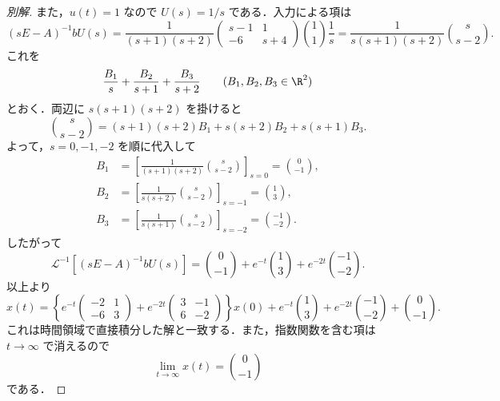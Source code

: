 \documentclass[article,paper=a4paper]{jlreq}
\begin{document}
\begin{proof}[別解]
また，$u(t)=1$ なので $U(s)=1/s$ である．入力による項は
\[
  (sE-A)^{-1}bU(s)
    =
    \frac{1}{(s+1)(s+2)}
    \begin{pmatrix}
      s-1 & 1\\
      -6 & s+4
    \end{pmatrix}
    \binom{1}{1}\frac{1}{s}
    =
    \frac{1}{s(s+1)(s+2)}
    \binom{s}{s-2}.
\]
これを
\[
  \frac{B_1}{s}+\frac{B_2}{s+1}+\frac{B_3}{s+2}
  \qquad (B_1,B_2,B_3\in\R^2)
\]
とおく．両辺に $s(s+1)(s+2)$ を掛けると
\[
  \binom{s}{s-2}
    =
    (s+1)(s+2)B_1
    +s(s+2)B_2
    +s(s+1)B_3.
\]
よって，$s=0,-1,-2$ を順に代入して
\begin{align*}
  B_1
    &=
    \left[
      \frac{1}{(s+1)(s+2)}
      \binom{s}{s-2}
    \right]_{s=0}
     =
    \binom{0}{-1},\\
  B_2
    &=
    \left[
      \frac{1}{s(s+2)}
      \binom{s}{s-2}
    \right]_{s=-1}
     =
    \binom{1}{3},\\
  B_3
    &=
    \left[
      \frac{1}{s(s+1)}
      \binom{s}{s-2}
    \right]_{s=-2}
     =
    \binom{-1}{-2}.
\end{align*}
したがって
\[
  \mathcal{L}^{-1}\!\left[(sE-A)^{-1}bU(s)\right]
    =
    \binom{0}{-1}
    +
    e^{-t}\binom{1}{3}
    +
    e^{-2t}\binom{-1}{-2}.
\]
以上より
\[
  x(t)
    =
    \left\{
      e^{-t}
      \begin{pmatrix}
        -2 & 1\\
        -6 & 3
      \end{pmatrix}
      +
      e^{-2t}
      \begin{pmatrix}
        3 & -1\\
        6 & -2
      \end{pmatrix}
    \right\}x(0)
    +
    e^{-t}\binom{1}{3}
    +
    e^{-2t}\binom{-1}{-2}
    +
    \binom{0}{-1}.
\]
これは時間領域で直接積分した解と一致する．また，指数関数を含む項は
$t\to\infty$ で消えるので
\[
  \lim_{t\to\infty}x(t)=\binom{0}{-1}
\]
である．
\end{proof}
\end{document}
